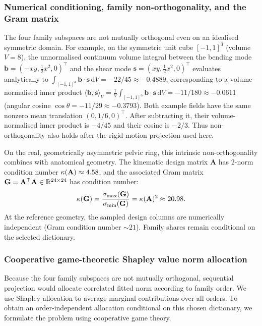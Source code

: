\documentclass[pdflatex,sn-basic]{sn-jnl}
\begin{document}
\subsubsection{Numerical conditioning, family non-orthogonality, and the Gram matrix}
The four family subspaces are not mutually orthogonal even on an idealised symmetric domain.
For example, on the symmetric unit cube $[-1, 1]^3$ (volume $V = 8$), the unnormalised continuum volume integral between the bending mode $\mathbf b = (-xy, \frac{1}{2}x^2, 0)^\top$ and the shear mode $\mathbf s = (xy, \frac{1}{2}x^2, 0)^\top$ evaluates analytically to $\int_{[-1, 1]^3} \mathbf b \cdot \mathbf s \, \mathrm dV = -22/45 \approx -0.4889$, corresponding to a volume-normalised inner product $\langle \mathbf b, \mathbf s \rangle_V = \frac{1}{V}\int_{[-1, 1]^3} \mathbf b \cdot \mathbf s \, \mathrm dV = -11/180 \approx -0.0611$ (angular cosine $\cos\theta = -11/29 \approx -0.3793$).
Both example fields have the same nonzero mean translation $(0,1/6,0)^\top$. After subtracting it, their volume-normalised inner product is $-4/45$ and their cosine is $-2/3$. Thus non-orthogonality also holds after the rigid-motion projection used here.

On the real, geometrically asymmetric pelvic ring, this intrinsic non-orthogonality combines with anatomical geometry.
The kinematic design matrix $\mathbf A$ has 2-norm condition number $\kappa(\mathbf A) \approx 4.58$, and the associated Gram matrix $\mathbf G = \mathbf A^\top \mathbf A \in \mathbb{R}^{24 \times 24}$ has condition number:
\begin{equation}
\kappa(\mathbf G) = \frac{\sigma_{\max}(\mathbf G)}{\sigma_{\min}(\mathbf G)} = \kappa(\mathbf A)^2 \approx 20.98.
\end{equation}
At the reference geometry, the sampled design columns are numerically independent (Gram condition number $\sim21$). Family shares remain conditional on the selected dictionary.

\subsubsection{Cooperative game-theoretic Shapley value norm allocation}
Because the four family subspaces are not mutually orthogonal, sequential projection would allocate correlated fitted norm according to family order. We use Shapley allocation to average marginal contributions over all orders.
To obtain an order-independent allocation conditional on this chosen dictionary, we formulate the problem using cooperative game theory.
\end{document}

